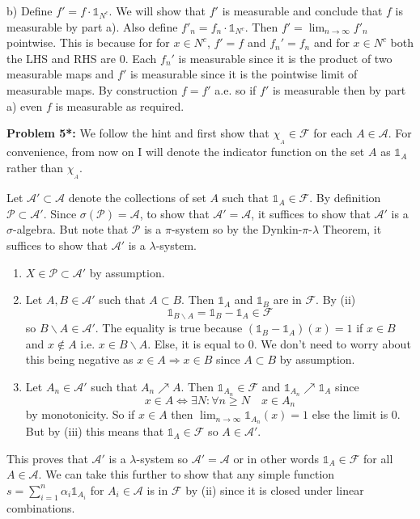\documentclass[12pt]{amsart} %
\def\1{\mathbb{1}}
\def\A{\mathcal{A}}
\def\P{\mathcal{P}}
\def\F{\mathcal{F}}
\begin{document}
\smallskip
b) Define $f' =f \cdot \1_{N^c}$. We will show that $f'$ is measurable and conclude that  $f$ is measurable by part a). Also define $f'_n = f_n \cdot \1_{N^c}$. Then $f' = \lim_{n \to \infty} f'_n$ pointwise. This is because for for $x \in N^c$, $f' = f$  and $f_n' = f_n$ and for $x \in N^c$ both the LHS and RHS are 0. Each $f_n'$ is measurable since it is the product of two measurable maps and  $f'$ is measurable since it is the pointwise limit of measurable maps. By construction $f = f'$ a.e. so if  $f'$ is measurable then by part a) even  $f$ is measurable as required.  

\bigskip
\noindent
\textbf{Problem 5*:} We follow the hint and first show that $\chi_{{}_{A}}\in \mathcal{F}$ for each $A\in \mathcal{A}$. For convenience, from now on I will denote the indicator function on the set $A$ as  $\1_A$ rather than $\chi_{{}_{A}}$.

Let $\A' \subset \A$ denote the collections of set $A$ such that  $\1_A \in 
 \F$. By definition $\P \subset \A'$. Since $\sigma(\P) = \A$, to show that $\A' = \A$, it suffices to show that  $\A'$ is a  $\sigma$-algebra. But note that $\P$ is a  $\pi$-system so by the Dynkin-$\pi$-$\lambda$ Theorem, it suffices to show  that $\A'$ is a  $\lambda$-system. 
 \begin{enumerate}
	 \item $X \in \P \subset \A'$ by assumption.
	 \item Let $A, B \in \A'$ such that $A \subset B$. Then $\1_A$ and  $\1_B$ are in  $\F$. By (ii)  $$\1_{B\backslash A} = \1_B - \1_A \in \F$$ so $B\backslash A \in \A'$. The equality is true because $(\1_B - \1_A)(x) = 1$ if $x \in B$ and $x \notin A$ i.e. $x \in B \backslash A$. Else, it is equal to $0$. We don't need to worry about this being negative as  $x \in A \Rightarrow x \in B$ since $A \subset B$ by assumption.
	 \item Let $A_n \in \A'$ such that $A_n \nearrow A$. Then  $\1_{A_n} \in \F$ and $\1_{A_n} \nearrow \1_{A}$ since $$x \in A \iff \exists N: \forall n \ge N \quad x \in A_n$$ by monotonicity. So if $x \in A$ then $\lim_{n \to \infty} \1_{A_n}(x) = 1$ else the limit is $0$. But by (iii) this means that  $\1_A \in \F$ so $A \in \A'$.	
 \end{enumerate}

 This proves that $\A'$ is a  $\lambda$-system so $\A' = \A$ or in other words  $\1_A \in \F$ for all $A \in \A$. We can take this further to show that any simple function $s = \sum_{i=1}^{n} \alpha_i \1_{A_i}$ for $A_i \in \A$ is in $\F$ by (ii) since it is closed under linear combinations. 
\end{document}
